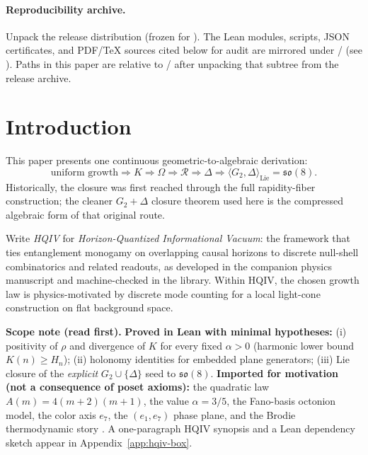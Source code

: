 \documentclass[11pt]{amsart}
\begin{document}
\paragraph{Reproducibility archive.}
Unpack the release distribution \ReleaseDistArchive{} (frozen for ). The Lean modules, scripts, JSON certificates, and PDF/\TeX{} sources cited below for audit are mirrored under \PaperReproBundleDir/ (see \PaperReproBundleManifest). Paths in this paper are relative to \PaperReproBundleDir/ after unpacking that subtree from the release archive.

\section{Introduction}

This paper presents one continuous geometric-to-algebraic derivation:
\[
\text{uniform growth} \Longrightarrow K \Longrightarrow \Omega \Longrightarrow \mathcal R
\Longrightarrow \Delta \Longrightarrow \langle G_2,\Delta\rangle_{\mathrm{Lie}}=\mathfrak{so}(8).
\]
Historically, the closure was first reached through the full rapidity-fiber construction; the cleaner \(G_2+\Delta\) closure theorem used here is the compressed algebraic form of that original route.

Write \emph{HQIV} for \emph{Horizon-Quantized Informational Vacuum}: the framework that ties entanglement monogamy on overlapping causal horizons to discrete null-shell combinatorics and related readouts, as developed in the companion physics manuscript and machine-checked in the \cite{hqiv-lean} library.
Within HQIV, the chosen growth law is physics-motivated by discrete mode counting for a local light-cone construction on flat background space.

\medskip
\noindent\textbf{Scope note (read first).}
\textbf{Proved in Lean with minimal hypotheses:} (i) positivity of \(\rho\) and divergence of \(K\) for every fixed \(\alpha>0\) (harmonic lower bound \(K(n)\ge H_n\)); (ii) holonomy identities for embedded plane generators; (iii) Lie closure of the \emph{explicit} \(G_2\cup\{\Delta\}\) seed to \(\mathfrak{so}(8)\).
\textbf{Imported for motivation (not a consequence of poset axioms):} the quadratic law \(A(m)=4(m+2)(m+1)\), the value \(\alpha=3/5\), the Fano-basis octonion model, the color axis \(e_7\), the \((e_1,e_7)\) phase plane, and the Brodie thermodynamic story \cite{brodie2026}.
A one-paragraph HQIV synopsis and a Lean dependency sketch appear in Appendix~\ref{app:hqiv-box}.
\end{document}
